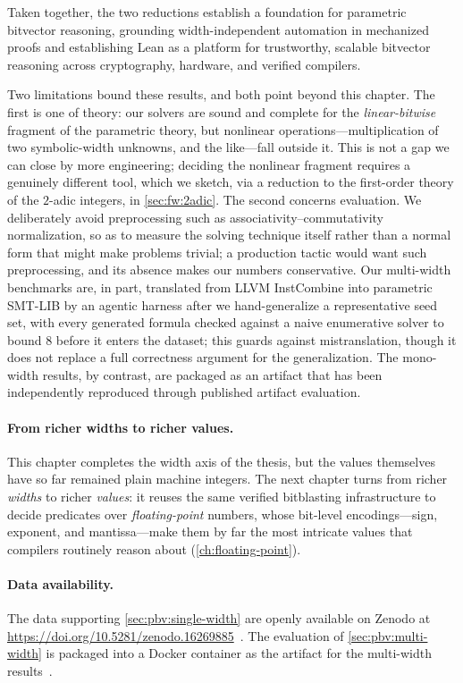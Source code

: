 Taken together, the two reductions establish a foundation for parametric
bitvector reasoning, grounding width-independent automation in mechanized proofs
and establishing Lean as a platform for trustworthy, scalable bitvector
reasoning across cryptography, hardware, and verified compilers.

Two limitations bound these results, and both point beyond this chapter. The
first is one of theory: our solvers are sound and complete for the
\emph{linear-bitwise} fragment of the parametric theory, but nonlinear
operations---multiplication of two symbolic-width unknowns, and the like---fall
outside it. This is not a gap we can close by more engineering; deciding the
nonlinear fragment requires a genuinely different tool, which we sketch, via a
reduction to the first-order theory of the $2$-adic integers, in
\cref{sec:fw:2adic}. The second concerns evaluation. We deliberately avoid
preprocessing such as associativity--commutativity normalization, so as to
measure the solving technique itself rather than a normal form that might make
problems trivial; a production tactic would want such preprocessing, and its
absence makes our numbers conservative. Our multi-width benchmarks are, in part,
translated from LLVM InstCombine into parametric SMT-LIB by an agentic harness
after we hand-generalize a representative seed set, with every generated formula
checked against a naive enumerative solver to bound $8$ before it enters the
dataset; this guards against mistranslation, though it does not replace a full
correctness argument for the generalization. The mono-width results, by
contrast, are packaged as an artifact that has been independently reproduced
through published artifact evaluation.

\paragraph{From richer widths to richer values.}
This chapter completes the width axis of the thesis, but the values themselves
have so far remained plain machine integers. The next chapter turns from richer
\emph{widths} to richer \emph{values}: it reuses the same verified bitblasting
infrastructure to decide predicates over \emph{floating-point} numbers, whose
bit-level encodings---sign, exponent, and mantissa---make them by far the most
intricate values that compilers routinely reason about (\cref{ch:floating-point}).

\paragraph{Data availability.}
The data supporting \cref{sec:pbv:single-width} are openly available on Zenodo
at \url{https://doi.org/10.5281/zenodo.16269885}~\cite{bhat_2025_16269885}. The
evaluation of \cref{sec:pbv:multi-width} is packaged into a Docker container as
the artifact for the multi-width results~\citep{bhat2026multiwidth}.
